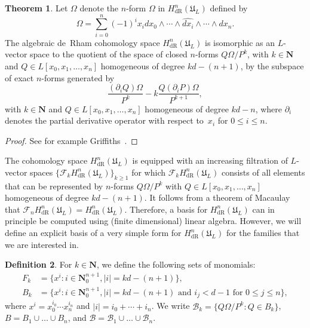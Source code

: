 \documentclass[a4paper,11pt]{article}
\numberwithin{equation}{section}
\providecommand{\abs}[1]{\lvert#1\rvert}                 %
\newcommand{\NN}{\mathbf{N}} %
\providecommand{\HdR}{H_{\text{dR}}}    %
\providecommand{\cB}{\mathcal{B}} %
\theoremstyle{definition}
\newtheorem{thm}{Theorem}[section]
\newtheorem{defn}[thm]{Definition}
\begin{document}
\begin{thm}
Let $\Omega$ denote the $n$-form $\Omega$ in $\HdR^{n}(\mathfrak{U}_L)$ 
defined by 
\begin{equation}
\Omega = \sum_{i=0}^n (-1)^i x_i d x_0 \wedge \dotsb \wedge \widehat{d x_i} \wedge \dotsb \wedge d x_n.
\end{equation}
The algebraic de~Rham cohomology space $\HdR^{n}(\mathfrak{U}_L)$ is 
isomorphic as an $L$-vector space to the quotient of the space of closed $n$-forms 
$Q \Omega / P^k$, with $k \in \NN$ and $Q \in L[x_0, x_1, \dotsc, x_n]$ 
homogeneous of degree $k d - (n + 1)$, by the subspace of exact $n$-forms generated by
\begin{equation} \label{eq:deRhamRel}
\frac{(\partial_i Q) \Omega}{P^k} - k \frac{Q (\partial_i P) \Omega}{P^{k+1}},
\end{equation}
with $k \in \NN$ and $Q \in L[x_0, x_1, \dotsc, x_n]$ 
homogeneous of degree $kd-n$, where $\partial_i$ 
denotes the partial derivative operator with respect to~$x_i$ for $0 \leq i \leq n$.
\end{thm}

\begin{proof}
See for example Griffiths~\citep[\S 4]{Griffiths1969}.
\end{proof}

The cohomology space $\HdR^{n}(\mathfrak{U}_L)$ is equipped with an 
increasing filtration of $L$-vector spaces $\{\mathcal{F}_k \HdR^{n}(\mathfrak{U}_L) \}_{k \geq 1}$ 
for which $\mathcal{F}_k \HdR^{n}(\mathfrak{U}_L)$ consists of all elements that
can be represented by $n$-forms $Q \Omega / P^k$  with $Q \in L[x_0, x_1, \dotsc, x_n]$ 
homogeneous of degree $kd - (n + 1)$. It follows from a theorem of Macaulay~\citep[\S 4, (4.11)]{Griffiths1969} 
that $\mathcal{F}_n \HdR^{n}(\mathfrak{U}_L)= \HdR^{n}(\mathfrak{U}_L)$. Therefore, a basis for 
$\HdR^{n}(\mathfrak{U}_L)$ can in principle be computed using (finite dimensional) linear algebra. 
However, we will define an explicit basis of a very simple form for $\HdR^{n}(\mathfrak{U}_L)$ for the
families that we are interested in.

\begin{defn} \label{defn:MonBasis}
For $k \in \NN$, we define the following sets of monomials: 
\begin{align*}
F_k & = \{ x^i : i \in \mathbf{N}_{0}^{n+1}, \abs{i} = k d - (n+1) \}, \\
B_k & = \{ x^i : i \in \mathbf{N}_{0}^{n+1}, \abs{i} = k d - (n+1) \text{ and $i_j < d-1$ for $0 \leq j \leq n$}\},
\end{align*}
where $x^i = x_0^{i_0} \dotsm x_n^{i_n}$ and 
$\abs{i} = i_0 + \dotsb + i_n$. We write $\cB_k= \{Q \Omega / P^k : Q \in B_k\}$, $B = B_1 \cup \dotsc \cup B_n$, 
and $\cB = \cB_1 \cup \dotsc \cup \cB_n$.
\end{defn}
\end{document}
